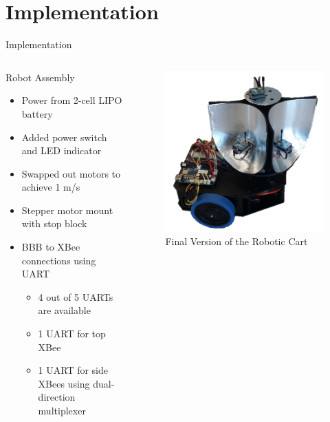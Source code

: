 \documentclass{beamer}
\begin{document}

\section{Implementation}

\begin{frame}{Implementation}
  \begin{columns}
    \begin{block}{Robot Assembly}
      \begin{itemize}
        \item Power from 2-cell LIPO battery
        \item Added power switch and LED indicator
        \item Swapped out motors to achieve 1 m/s
        \item Stepper motor mount with stop block
        \item BBB to XBee connections using UART
        \begin{itemize}
          \item 4 out of 5 UARTs are available
          \item 1 UART for top XBee
          \item 1 UART for side XBees using dual-direction multiplexer
        \end{itemize}
      \end{itemize}
    \end{block}
    \begin{figure}
      \centering
      \includegraphics[width=\textwidth]{figs/img/Finalized_robot.png}
      \caption{Final Version of the Robotic Cart}
      \label{fig:FinalizedRobot}
    \end{figure}
  \end{columns}
\end{frame}
\end{document}
